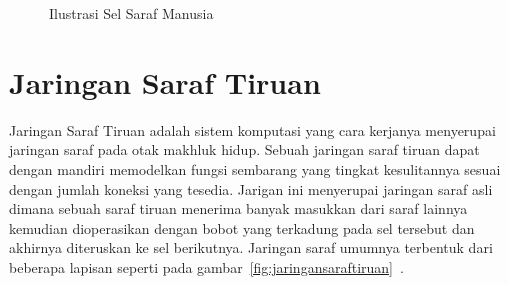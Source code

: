 \begin{figure}[htbp]
    \begin{center}
    \end{center}
    \vspace{-20pt}
    \captionsetup{labelfont=bf, textfont=bf}
    \caption{Ilustrasi Sel Saraf Manusia}
    \vspace{-10pt}
    \captionsetup{labelfont=md, textfont=md}
    \label{fig:selsaraf}
\end{figure}

\section{Jaringan Saraf Tiruan}
\label{sec:2-JaringanSarafTiruan}

Jaringan Saraf Tiruan adalah sistem komputasi yang cara kerjanya menyerupai jaringan saraf pada otak
makhluk hidup. Sebuah jaringan saraf tiruan dapat dengan mandiri
memodelkan fungsi sembarang yang tingkat kesulitannya sesuai dengan jumlah koneksi yang tesedia.
Jarigan ini menyerupai jaringan saraf asli dimana
sebuah saraf tiruan menerima banyak masukkan dari saraf lainnya
kemudian dioperasikan dengan bobot yang terkadung pada sel tersebut dan akhirnya diteruskan ke sel
berikutnya. Jaringan saraf umumnya terbentuk dari beberapa lapisan seperti pada
gambar~\ref{fig:jaringansaraftiruan}~\cite{croann}.

